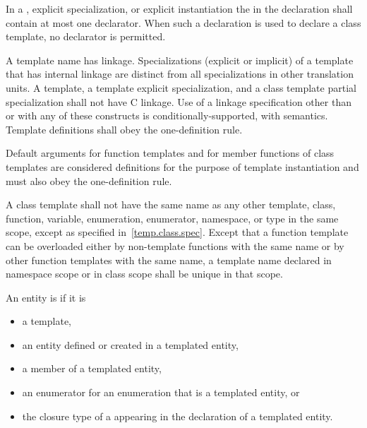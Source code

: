 \pnum
In a
,
explicit specialization, or explicit instantiation the
in the declaration shall contain at most one declarator.
When such a declaration is used to declare a class template,
no declarator is permitted.

\pnum
{}%
A template name has linkage.
Specializations (explicit or implicit) of
a template that has internal linkage are
distinct from all specializations in other translation
units.
A template, a template explicit specialization, and a class
template partial specialization shall not have C linkage. Use of a linkage specification
other than  or  with any of these constructs is
conditionally-supported, with
 semantics.
Template definitions shall obey the one-definition rule.
\begin{note}
Default arguments for function templates and for member functions of
class templates are considered definitions for the purpose of template
instantiation and must also obey the one-definition rule.
\end{note}

\pnum
A class template shall not have the same name as any other
template, class, function, variable, enumeration, enumerator, namespace, or
type in the same scope, except as specified in~\ref{temp.class.spec}.
Except that a function template can be overloaded either by non-template
functions with the same name or by other function templates
with the same name,
a template name declared in namespace scope or in class scope shall be unique
in that scope.

\pnum
{}%
An entity is 
if it is
\begin{itemize}
\item a template,
\item an entity defined or created
      in a templated entity,
\item a member of a templated entity,
\item an enumerator for an enumeration that is a templated entity, or
\item the closure type of a 
      appearing in the declaration of a templated entity.
\end{itemize}

